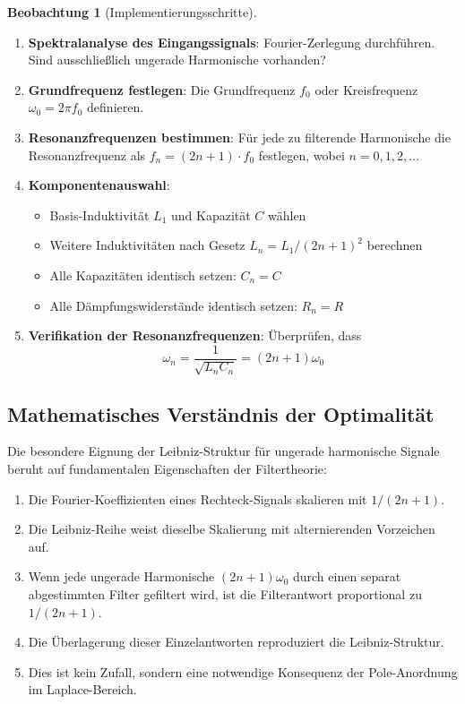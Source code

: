 \documentclass[a4paper, 12pt, twoside, openright]{report}
\theoremstyle{definition}
\newtheorem{beobachtung}{Beobachtung}
\theoremstyle{definition}
\begin{document}
\begin{beobachtung}[Implementierungsschritte]
\begin{enumerate}
	\item \textbf{Spektralanalyse des Eingangssignals}: Fourier-Zerlegung durchführen. Sind ausschließlich ungerade Harmonische vorhanden?
	
	\item \textbf{Grundfrequenz festlegen}: Die Grundfrequenz $f_0$ oder Kreisfrequenz $\omega_0 = 2\pi f_0$ definieren.
	
	\item \textbf{Resonanzfrequenzen bestimmen}: Für jede zu filterende Harmonische die Resonanzfrequenz als $f_n = (2n+1) \cdot f_0$ festlegen, wobei $n = 0, 1, 2, \ldots$
	
	\item \textbf{Komponentenauswahl}:
	\begin{itemize}
		\item Basis-Induktivität $L_1$ und Kapazität $C$ wählen
		\item Weitere Induktivitäten nach Gesetz $L_n = L_1 / (2n+1)^2$ berechnen
		\item Alle Kapazitäten identisch setzen: $C_n = C$
		\item Alle Dämpfungswiderstände identisch setzen: $R_n = R$
	\end{itemize}
	
	\item \textbf{Verifikation der Resonanzfrequenzen}: Überprüfen, dass 
	$$\omega_n = \frac{1}{\sqrt{L_n C_n}} = (2n+1) \omega_0$$
\end{enumerate}
\end{beobachtung}

\subsection{Mathematisches Verständnis der Optimalität}

Die besondere Eignung der Leibniz-Struktur für ungerade harmonische Signale beruht auf fundamentalen Eigenschaften der Filtertheorie:

\begin{enumerate}
	\item Die Fourier-Koeffizienten eines Rechteck-Signals skalieren mit $1/(2n+1)$.
	
	\item Die Leibniz-Reihe weist dieselbe Skalierung mit alternierenden Vorzeichen auf.
	
	\item Wenn jede ungerade Harmonische $(2n+1)\omega_0$ durch einen separat abgestimmten Filter gefiltert wird, ist die Filterantwort proportional zu $1/(2n+1)$.
	
	\item Die Überlagerung dieser Einzelantworten reproduziert die Leibniz-Struktur.
	
	\item Dies ist kein Zufall, sondern eine notwendige Konsequenz der Pole-Anordnung im Laplace-Bereich.
\end{enumerate}
\end{document}
